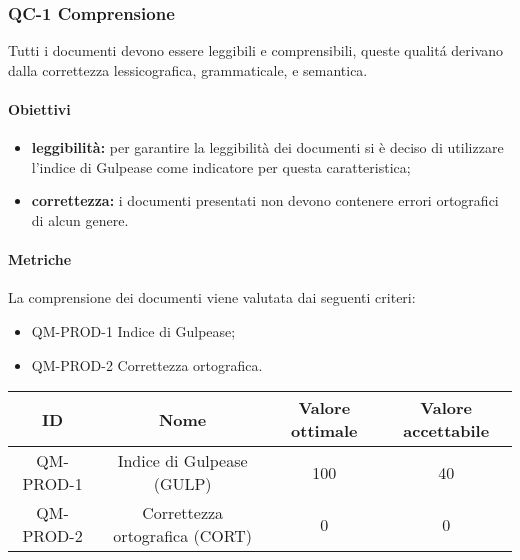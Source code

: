 \subsubsection{QC-1 Comprensione}
Tutti i documenti devono essere leggibili e comprensibili, queste qualitá derivano dalla correttezza lessicografica, grammaticale, e semantica.
	\paragraph{Obiettivi}
		\begin{itemize}
			\item \textbf{leggibilità:} per garantire la leggibilità dei documenti si è deciso di utilizzare l'indice di Gulpease come indicatore per questa caratteristica;
			\item \textbf{correttezza:} i documenti presentati non devono contenere errori ortografici di alcun genere.
		\end{itemize}
	\paragraph{Metriche}
	La comprensione dei documenti viene valutata dai seguenti criteri:
	\begin{itemize}
		\item QM-PROD-1 Indice di Gulpease;
    \item QM-PROD-2 Correttezza ortografica.
	\end{itemize}
	\begin{center}
		\begin{tabular}{|c|c|c|c|}
			\rowcolor{lighter-grayer}
			\hline
			ID & Nome & Valore ottimale & Valore accettabile \\
			\hline
			QM-PROD-1 & Indice di Gulpease (GULP) & 100 & 40 \\
      \hline
			QM-PROD-2 & Correttezza ortografica (CORT) & 0 & 0 \\
			\hline
		\end{tabular}
	\end{center}
